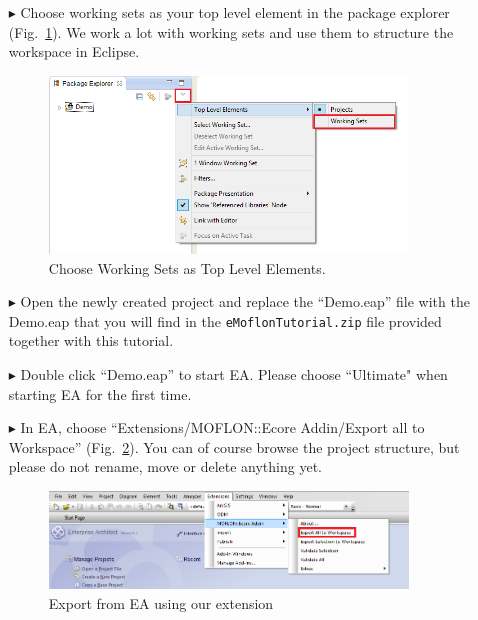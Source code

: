 \begin{enumerate}
\FloatBarrier
\item[$\blacktriangleright$] Choose working sets as your top level element in the package explorer (Fig.~\ref{fig_eclipseWorkingsets}).
We work a lot with working sets and use them to structure the workspace in Eclipse.

\begin{figure}[htbp]
	\centering
  \includegraphics[width=0.9\textwidth]{pics/installationAndSetup/eclipse_workingsets.png}
	\caption{Choose Working Sets as Top Level Elements.}
	\label{fig_eclipseWorkingsets}
\end{figure} 


\item[$\blacktriangleright$] Open the newly created project and replace the ``Demo.eap'' file with the Demo.eap that you will find in the \texttt{eMoflonTutorial.zip} file provided together with this tutorial. 

\item[$\blacktriangleright$] Double click ``Demo.eap'' to start EA.
Please choose ``Ultimate" when starting EA for the first time.

\item[$\blacktriangleright$] In EA, choose ``Extensions/MOFLON::Ecore Addin/Export\- all\- to\- Workspace'' (Fig.~\ref{fig_ea}).
You can of course browse the project structure, but please do not rename, move or delete anything yet.
\begin{figure}[htbp]
	\centering
  \includegraphics[width=0.9\textwidth]{pics/installationAndSetup/ea_firststart.png}
	\caption{Export from EA using our extension} 
	\label{fig_ea} 
\end{figure}


\end{enumerate}
